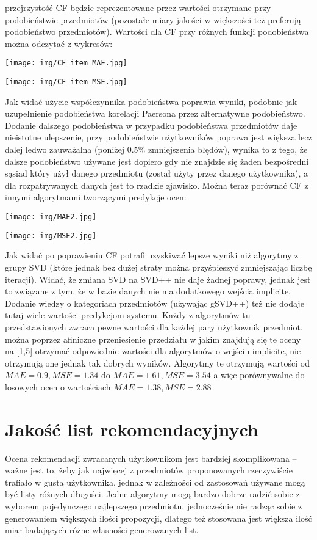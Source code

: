 \documentclass{pracamgr}
\begin{document}
   przejrzystość CF będzie reprezentowane przez wartości otrzymane przy podobieństwie przedmiotów
   (pozostałe miary jakości w większości też preferują podobieństwo przedmiotów).
   Wartości dla CF przy różnych funkcji podobieństwa można odczytać z wykresów:
   \begin{center}
    \texttt{[image: img/CF\_item\_MAE.jpg]}
   \end{center}
   \begin{center}
    \texttt{[image: img/CF\_item\_MSE.jpg]}
   \end{center}
   Jak widać użycie współczynnika podobieństwa poprawia wyniki, podobnie jak uzupełnienie podobieństwa korelacji Paersona przez alternatywne podobieństwo.
   Dodanie dalszego podobieństwa w przypadku podobieństwa przedmiotów daje nieistotne ulepszenie,
   przy podobieństwie użytkowników poprawa jest większa lecz dalej ledwo zauważalna (poniżej 0.5\% zmniejszenia błędów),
   wynika to z tego, że dalsze podobieństwo używane jest dopiero gdy nie znajdzie się żaden bezpośredni sąsiad 
   który użył danego przedmiotu (został użyty przez danego użytkownika), a dla rozpatrywanych danych jest to rzadkie zjawisko.
   Można teraz porównać CF z innymi algorytmami tworzącymi predykcje ocen:
   \begin{center}
    \texttt{[image: img/MAE2.jpg]}
   \end{center}
   \begin{center}
    \texttt{[image: img/MSE2.jpg]}
   \end{center}
   Jak widać po poprawieniu CF potrafi uzyskiwać lepsze wyniki niż algorytmy z grupy SVD
   (które jednak bez dużej straty można przyśpieszyć zmniejszając liczbę iteracji).
   Widać, że zmiana SVD na SVD++ nie daje żadnej poprawy, jednak jest to związane z tym, że w bazie danych nie ma dodatkowego wejścia implicite.
   Dodanie wiedzy o kategoriach przedmiotów (używając gSVD++) też nie dodaje tutaj wiele wartości predykcjom systemu.
   Każdy z algorytmów tu przedstawionych zwraca pewne wartości dla każdej pary użytkownik przedmiot, można poprzez afiniczne przeniesienie przedziału
   w jakim znajdują się te oceny na [1,5] otrzymać odpowiednie wartości dla algorytmów o wejściu implicite, nie otrzymują one jednak tak dobrych wyników.
   Algorytmy te otrzymują wartości od $MAE=0.9,MSE=1.34$ do $MAE=1.61,MSE=3.54$ a więc porównywalne do losowych ocen o
   wartościach $MAE=1.38,MSE=2.88$
  \section{Jakość list rekomendacyjnych}
   Ocena rekomendacji zwracanych użytkownikom jest bardziej skomplikowana -- ważne jest to, żeby jak najwięcej z przedmiotów proponowanych rzeczywiście trafiało
   w gusta użytkownika, jednak w zależności od zastosowań używane mogą być listy różnych długości.
   Jedne algorytmy mogą bardzo dobrze radzić sobie z wyborem pojedynczego najlepszego przedmiotu,
   jednocześnie nie radząc sobie z generowaniem większych ilości propozycji, dlatego też stosowana
   jest większa ilość miar badających różne własności generowanych list.
\end{document}
